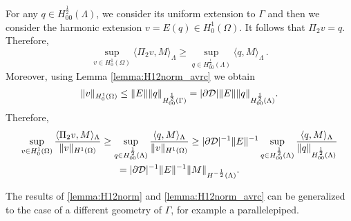 \begin{itemize}
For any $q \in H^{\frac 12}_{00}(\Lambda)$, we consider its uniform extension to $\Gamma$ 
and then we consider the harmonic extension $v=E(q)\in H^1_0(\Omega)$. It follows that $\Pi_2 v=q$. Therefore, 
\begin{equation*}
\sup _{v\in H^1_0(\Omega)}  \langle \Pi_2 v, M \rangle_\Lambda \geq \sup_{q \in H^{\frac 12}_{00}(\Lambda)} \langle q, M  \rangle_\Lambda\,.
\end{equation*}
Moreover, using Lemma \ref{lemma:H12norm_avrc} we obtain
\begin{equation*}
\|v\|_{H^1_0(\Omega)}\leq \|E\| \|q\|_{H^{\frac 12}_{00}(\Gamma)}  = | \partial {\cal D} | \|E\| \|q\|_{H^{\frac 12}_{00}(\Lambda)}.
\end{equation*}
 Therefore,
\begin{multline*}
\sup _{v\in H^1_0(\Omega)} \frac{ \langle \Pi_2 v, M \rangle_\Lambda}{\|v\|_{H^1(\Omega)}}
\geq \sup _{q\in H^{\frac 12}_{00}(\Lambda)} \frac{ \langle q, M \rangle_\Lambda}{\|v\|_{H^1(\Omega)}}
\geq |\partial {\cal D}|^{-1} \|E\|^{-1} \sup _{q\in H^{\frac 12}_{00}(\Lambda)} \frac{ \langle q, M \rangle_\Lambda}{\|q\|_{H^{\frac 12}_{00}(\Lambda)}} 
\\= |\partial {\cal D}|^{-1} \|E\|^{-1} \|M\|_{H^{-\frac 12}(\Lambda)}.
\end{multline*}

\end{itemize}

\begin{remark}
The results of \eqref{lemma:H12norm} and \eqref{lemma:H12norm_avrc} can be generalized to the case of a  different geometry of $\Gamma$, for example a parallelepiped.  
\end{remark}